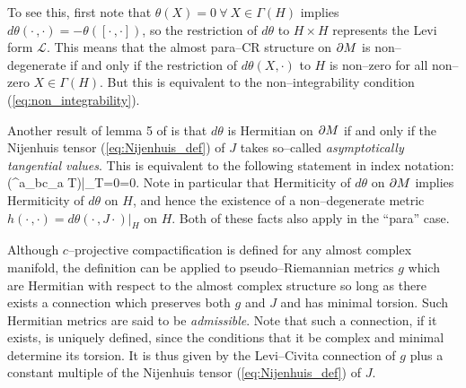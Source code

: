 To see this, first note that $\theta(X)=0\ \forall\ X\in\Gamma( H )$ implies $d\theta(\cdot\,,\cdot)=-\theta([\cdot\,,\cdot])$, so the restriction of $d\theta$ to $ H \times H $ represents the Levi form $\mathcal{L}$. This means that the almost para--CR structure on $\partial M$ is non--degenerate if and only if the restriction of $d\theta(X,\cdot)$ to $ H $ is non--zero for all non--zero $X\in\Gamma( H )$. But this is equivalent to the non--integrability condition (\ref{eq:non_integrability}).


Another result of lemma 5 of \cite{CG} is that $d\theta$ is Hermitian on $\partial M$ if and only if the Nijenhuis tensor (\ref{eq:Nijenhuis_def}) of $J$ takes so--called \textit{asymptotically tangential values}. This is equivalent to the following statement in index notation:
\be
\label{Nijenhuis_condition}
\Big({^{a}}_{bc}\nabla_a T\Big)\Big|_{T=0}=0.  \ee
Note in particular that Hermiticity of $d\theta$ on $\partial M$ implies Hermiticity of $d\theta$ on $ H $, and hence the existence of a non--degenerate metric $h(\cdot\,,\cdot)=d\theta(\cdot\,,J\cdot)|_ H $ on $ H $. Both of these facts also apply in the ``para'' case.


Although $c$--projective compactification is defined for any almost complex manifold, the definition can be applied to pseudo--Riemannian metrics $g$ which are Hermitian with respect to the almost complex structure so long as there exists a connection which preserves both $g$ and $J$ and has minimal torsion. Such Hermitian metrics are said to be \textit{admissible}.  Note that such a connection, if it exists, is uniquely defined, since the conditions that it be complex and minimal determine its torsion. It is thus given by the Levi--Civita connection of $g$ plus a constant multiple of the Nijenhuis tensor (\ref{eq:Nijenhuis_def}) of $J$.

